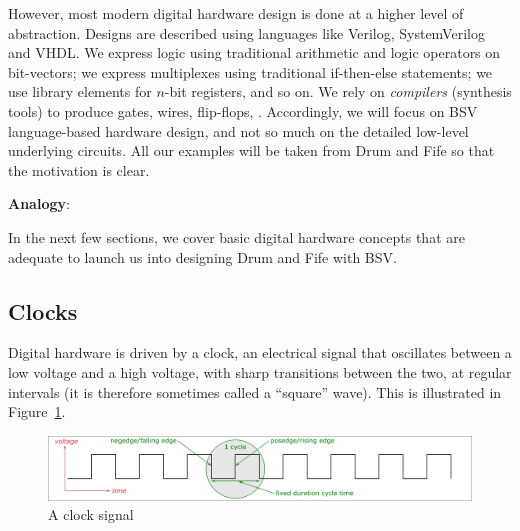 However, most modern digital hardware design is done at a higher level
of abstraction.  Designs are described using languages like Verilog,
SystemVerilog and VHDL.  We express logic using traditional arithmetic
and logic operators on bit-vectors; we express multiplexes using
traditional if-then-else statements; we use library elements for
$n$-bit registers, and so on.  We rely on \emph{compilers} (synthesis
tools) to produce gates, wires, flip-flops, {\etc}.  Accordingly, we
will focus on BSV language-based hardware design, and not so much on
the detailed low-level underlying circuits.  All our examples will be
taken from Drum and Fife so that the motivation is clear.


\vspace{1ex}

{\bf Analogy}:

\vspace{1ex}


In the next few sections, we cover basic digital hardware concepts
that are adequate to launch us into designing Drum and Fife with BSV.


\subsection{Clocks}

Digital hardware is driven by a clock, an electrical signal that
oscillates between a low voltage and a high voltage, with sharp
transitions between the two, at regular intervals (it is therefore
sometimes called a ``square'' wave).  This is illustrated in
Figure~\ref{Fig_Clock_1}.

\begin{figure}[htbp]
  \centerline{\includegraphics[width=6in,angle=0]{Figures/Fig_Clock}}
  \caption{\label{Fig_Clock_1}A clock signal}
\end{figure}

